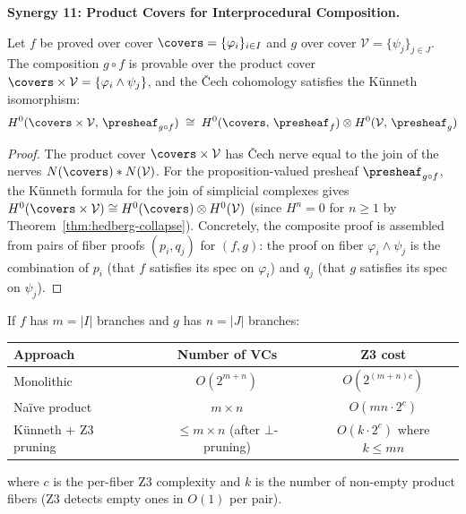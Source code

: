 \noindent\textbf{Synergy 11: Product Covers for Interprocedural Composition.}

\begin{theorem}
\label{thm:kunneth-ref}
Let $f$ be proved over cover $\covers = \{\varphi_i\}_{i \in I}$ and
$g$ over cover $\mathcal{V} = \{\psi_j\}_{j \in J}$.  The composition
$g \circ f$ is provable over the product cover
$\covers \times \mathcal{V} = \{\varphi_i \wedge \psi_j\}$, and the
\v{C}ech cohomology satisfies the K\"{u}nneth isomorphism:
\[
  H^0(\covers \times \mathcal{V},\, \presheaf_{g \circ f})
  \;\cong\;
  H^0(\covers,\, \presheaf_f) \otimes H^0(\mathcal{V},\, \presheaf_g)
\]
\end{theorem}

\begin{proof}
The product cover $\covers \times \mathcal{V}$ has \v{C}ech nerve equal to
the join of the nerves $N(\covers) * N(\mathcal{V})$.  For the
proposition-valued presheaf $\presheaf_{g \circ f}$, the K\"{u}nneth formula
for the join of simplicial complexes gives
$H^0(\covers \times \mathcal{V}) \cong H^0(\covers) \otimes H^0(\mathcal{V})$
(since $H^n = 0$ for $n \ge 1$ by Theorem~\ref{thm:hedberg-collapse}).
Concretely, the composite proof is assembled from pairs of fiber proofs
$(p_i, q_j)$ for $(f, g)$: the proof on fiber $\varphi_i \wedge \psi_j$
is the combination of $p_i$ (that $f$ satisfies its spec on $\varphi_i$)
and $q_j$ (that $g$ satisfies its spec on $\psi_j$).
\end{proof}

\begin{proposition}
\label{prop:kunneth-complexity}
If $f$ has $m = |I|$ branches and $g$ has $n = |J|$ branches:
\begin{center}
\renewcommand{\arraystretch}{1.3}
\begin{tabular}{lcc}
\toprule
\textbf{Approach} & \textbf{Number of VCs} & \textbf{Z3 cost} \\
\midrule
Monolithic & $O(2^{m+n})$ & $O(2^{(m+n)c})$ \\
Naïve product & $m \times n$ & $O(mn \cdot 2^c)$ \\
Künneth + Z3 pruning & $\le m \times n$ (after $\bot$-pruning) &
  $O(k \cdot 2^c)$ where $k \le mn$ \\
\bottomrule
\end{tabular}
\end{center}
where $c$ is the per-fiber Z3 complexity and $k$ is the number of
non-empty product fibers (Z3 detects empty ones in $O(1)$ per pair).
\end{proposition}

